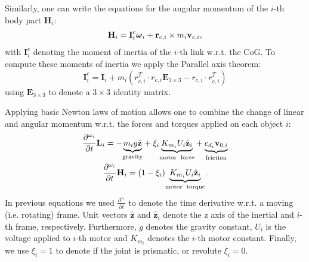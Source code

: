 Similarly, one can write the equations for the angular momentum of the $i$-th body part $\textbf{H}_i$:
\begin{align}
\textbf{H}_i = \textbf{I}_i^c \boldsymbol{\omega}_i+\textbf{r}_{c,i} \times m_i \textbf{v}_{c,i},
\end{align}
with $\textbf{I}_i^c$ denoting the moment of inertia of the $i$-th link w.r.t. the CoG. To compute these moments of inertia we apply the Parallel axis theorem:
\begin{equation}
\textbf{I}_i^c=\textbf{I}_i+m_i\left( r_{c,i}^T\cdot r_{c,i} \textbf{E}_{3 \times 3} - r_{c,i}\cdot r_{c,i}^T \right)
\end{equation}
using $\textbf{E}_{3 \times 3}$ to denote a $3 \times 3$ identity matrix.

Applying basic Newton laws of motion allows one to combine the change of linear and angular momentum w.r.t. the forces and torques applied on each object $i$:
\begin{gather}
\frac{\partial ^{\omega_i} }{\partial t }\textbf{L}_i = -\underset{\textup{gravity}}{\underbrace{m_i g \hat{\textbf{z}}}} + \xi_i \underset{\textup{motor\; force}}{\underbrace{K_{m_i} U_i \hat{\textbf{z}}_i}} +\underset{\textup{friction}}{\underbrace{ c_{d_i} \textbf{v}_{0,i}}} \\ \nonumber
\frac{\partial ^{\omega_i} }{\partial t }\textbf{H}_i = (1 - \xi_i)\underset{\textup{motor\; torque}}{\underbrace{ K_{m_i} U_i \hat{\textbf{z}}_i}}.
\end{gather}
In previous equations we used $\frac{\partial ^{\omega_i} }{\partial t }$ to denote the time derivative w.r.t. a moving (i.e. rotating) frame. Unit vectors $\hat{\textbf{z}}$ and $\hat{\textbf{z}}_i$ denote the z axis of the inertial and $i$-th frame, respectively. Furthermore, $g$ denotes the gravity constant, $U_i$ is the voltage applied to $i$-th motor and $K_{m_i}$ denotes the $i$-th motor constant. Finally, we use $\xi_i=1$ to denote if the joint is prismatic, or revolute $\xi_i=0$. 


